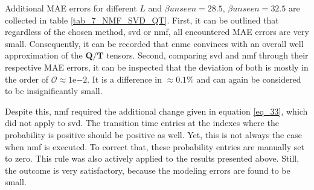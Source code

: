 Additional MAE errors for different $L$ and $\beta{unseen}= 28.5,\, \beta{unseen}= 32.5$ are collected in table \ref{tab_7_NMF_SVD_QT}.
First, it can be outlined that regardless of the chosen method, \gls{svd} or \gls{nmf}, all encountered MAE errors are very small. 
Consequently, it can be recorded that \gls{cnmc} convinces with an overall well approximation of the $\bm Q / \bm T$ tensors.
Second, comparing \gls{svd} and \gls{nmf} through their respective MAE errors, it can be inspected that the deviation of both is mostly in the order of $ \mathcal{O} \approx 1 \mathrm{e}{-2}$. 
It is a difference in $\approx 0.1 \%$ and can again be considered to be insignificantly small.\newline 

Despite this, \gls{nmf} required the additional change given in equation \eqref{eq_33}, which did not apply to \gls{svd}. 
The transition time entries at the indexes where the probability is positive should be positive as well. Yet, this is not always the case when \gls{nmf} is executed. To correct that, these probability entries are manually set to zero.
This rule was also actively applied to the results presented above. 
Still, the outcome is very satisfactory, because the modeling errors are found to be small. 
\newline

